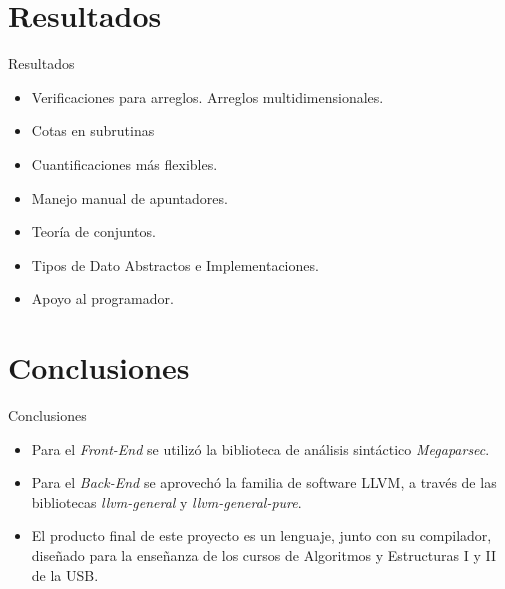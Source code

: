 \section{ }

\section{Resultados}
\begin{frame}{Resultados}
\begin{itemize}
  \item Verificaciones para arreglos. Arreglos multidimensionales.
  \item Cotas en subrutinas
  \item Cuantificaciones más flexibles.
  \item Manejo manual de apuntadores.
  \item Teoría de conjuntos.
  \item Tipos de Dato Abstractos e Implementaciones.
  \item Apoyo al programador.
\end{itemize}
\end{frame}

\section{Conclusiones}
\begin{frame}{Conclusiones}
\begin{itemize}
  \item Para el \textit{Front-End} se utilizó la biblioteca de análisis sintáctico \textit{Megaparsec}.
  \item Para el \textit{Back-End}
  se aprovechó la familia de software LLVM, a través de las bibliotecas \textit{llvm-general} y \textit{llvm-general-pure}.
  \item El producto final de este proyecto es un lenguaje, junto con su compilador, diseñado para la enseñanza de los cursos de Algoritmos y Estructuras I y II de la USB.
\end{itemize}
\end{frame}

